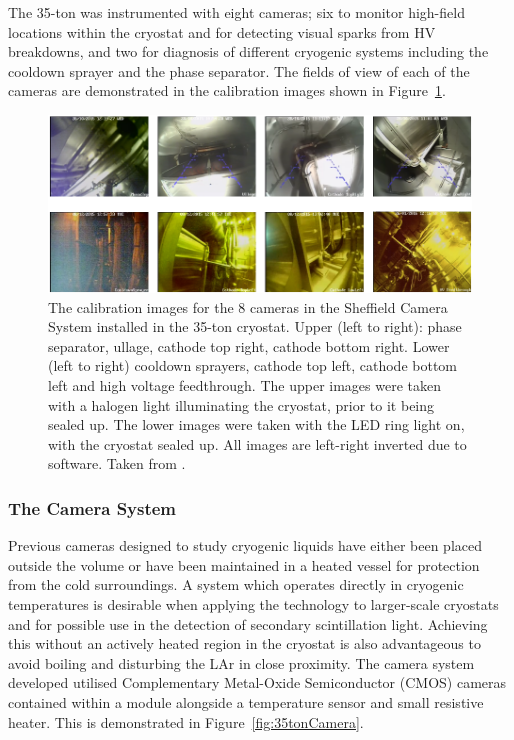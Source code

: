 The 35-ton was instrumented with eight cameras; six to monitor high-field locations within the cryostat and for detecting visual sparks from HV breakdowns, and two for diagnosis of different cryogenic systems including the cooldown sprayer and the phase separator.  The fields of view of each of the cameras are demonstrated in the calibration images shown in Figure~\ref{fig:35tonCamerasImages}.

\begin{figure}
  \centering
  \includegraphics[width=15cm]{35tonCamerasImages.pdf}
  \caption[The calibration images for the 8 cameras in the Sheffield Camera System installed in the 35-ton cryostat.]{The calibration images for the 8 cameras in the Sheffield Camera System installed in the 35-ton cryostat.  Upper (left to right): phase separator, ullage, cathode top right, cathode bottom right.  Lower (left to right) cooldown sprayers, cathode top left, cathode bottom left and high voltage feedthrough.  The upper images were taken with a halogen light illuminating the cryostat, prior to it being sealed up.  The lower images were taken with the LED ring light on, with the cryostat sealed up. All images are left-right inverted due to software.  Taken from \cite{35tonCameras2017}.}
  \label{fig:35tonCamerasImages}
\end{figure}

\subsubsection{The Camera System}\label{sec:35tonCameraSystem}

Previous cameras designed to study cryogenic liquids have either been placed outside the volume or have been maintained in a heated vessel for protection from the cold surroundings.  A system which operates directly in cryogenic temperatures is desirable when applying the technology to larger-scale cryostats and for possible use in the detection of secondary scintillation light.  Achieving this without an actively heated region in the cryostat is also advantageous to avoid boiling and disturbing the LAr in close proximity.  The camera system developed utilised Complementary Metal-Oxide Semiconductor (CMOS) cameras contained within a module alongside a temperature sensor and small resistive heater.  This is demonstrated in Figure~\ref{fig:35tonCamera}.

